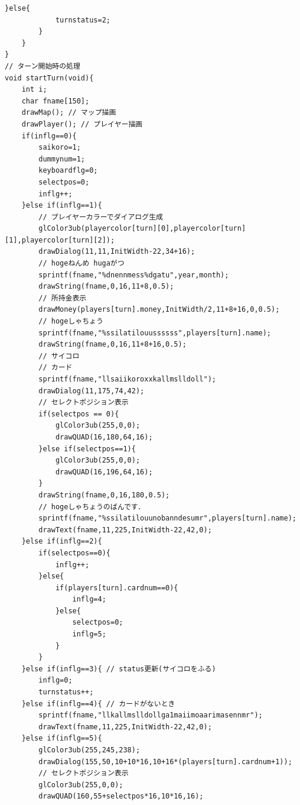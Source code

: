 \documentclass[a4j]{jarticle}
\begin{document}
\begin{lstlisting}[basicstyle=\ttfamily\footnotesize, frame=single,label=code2,caption=game.c]
        }else{
            turnstatus=2;
        }
    }
}
// ターン開始時の処理
void startTurn(void){
    int i;
    char fname[150];
    drawMap(); // マップ描画
    drawPlayer(); // プレイヤー描画
    if(inflg==0){
        saikoro=1;
        dummynum=1;
        keyboardflg=0;
        selectpos=0;
        inflg++;
    }else if(inflg==1){
        // プレイヤーカラーでダイアログ生成
        glColor3ub(playercolor[turn][0],playercolor[turn][1],playercolor[turn][2]);
        drawDialog(11,11,InitWidth-22,34+16);
        // hogeねんめ hugaがつ
        sprintf(fname,"%dnennmess%dgatu",year,month);
        drawString(fname,0,16,11+8,0.5);
        // 所持金表示
        drawMoney(players[turn].money,InitWidth/2,11+8+16,0,0.5);
        // hogeしゃちょう
        sprintf(fname,"%ssilatilouussssss",players[turn].name);
        drawString(fname,0,16,11+8+16,0.5);   
        // サイコロ
        // カード
        sprintf(fname,"llsaiikoroxxkallmslldoll");
        drawDialog(11,175,74,42);
        // セレクトポジション表示
        if(selectpos == 0){
            glColor3ub(255,0,0);
            drawQUAD(16,180,64,16);                 
        }else if(selectpos==1){
            glColor3ub(255,0,0);
            drawQUAD(16,196,64,16);               
        }   
        drawString(fname,0,16,180,0.5);
        // hogeしゃちょうのばんです．
        sprintf(fname,"%ssilatilouunobanndesumr",players[turn].name);
        drawText(fname,11,225,InitWidth-22,42,0);      
    }else if(inflg==2){
        if(selectpos==0){
            inflg++;
        }else{
            if(players[turn].cardnum==0){
                inflg=4;
            }else{
                selectpos=0;
                inflg=5;
            }
        }
    }else if(inflg==3){ // status更新(サイコロをふる)
        inflg=0;
        turnstatus++;
    }else if(inflg==4){ // カードがないとき
        sprintf(fname,"llkallmslldollga1maiimoaarimasennmr");
        drawText(fname,11,225,InitWidth-22,42,0);               
    }else if(inflg==5){
        glColor3ub(255,245,238);
        drawDialog(155,50,10+10*16,10+16*(players[turn].cardnum+1));
        // セレクトポジション表示
        glColor3ub(255,0,0);
        drawQUAD(160,55+selectpos*16,10*16,16);                 
        

\end{lstlisting}
\end{document}
